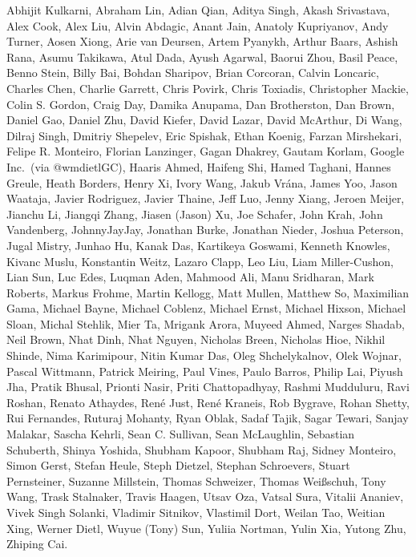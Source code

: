 Abhijit Kulkarni,
Abraham Lin,
Adian Qian,
Aditya Singh,
Akash Srivastava,
Alex Cook,
Alex Liu,
Alvin Abdagic,
Anant Jain,
Anatoly Kupriyanov,
Andy Turner,
Aosen Xiong,
Arie van Deursen,
Artem Pyanykh,
Arthur Baars,
Ashish Rana,
Asumu Takikawa,
Atul Dada,
Ayush Agarwal,
Baorui Zhou,
Basil Peace,
Benno Stein,
Billy Bai,
Bohdan Sharipov,
Brian Corcoran,
Calvin Loncaric,
Charles Chen,
Charlie Garrett,
Chris Povirk,
Chris Toxiadis,
Christopher Mackie,
Colin S. Gordon,
Craig Day,
Damika Anupama,
Dan Brotherston,
Dan Brown,
Daniel Gao,
Daniel Zhu,
David Kiefer,
David Lazar,
David McArthur,
Di Wang,
Dilraj Singh,
Dmitriy Shepelev,
Eric Spishak,
Ethan Koenig,
Farzan Mirshekari,
Felipe R. Monteiro,
Florian Lanzinger,
Gagan Dhakrey,
Gautam Korlam,
Google Inc.\ (via @wmdietlGC),
Haaris Ahmed,
Haifeng Shi,
Hamed Taghani,
Hannes Greule,
Heath Borders,
Henry Xi,
Ivory Wang,
Jakub Vr\'ana,
James Yoo,
Jason Waataja,
Javier Rodriguez,
Javier Thaine,
Jeff Luo,
Jenny Xiang,
Jeroen Meijer,
Jianchu Li,
Jiangqi Zhang,
Jiasen (Jason) Xu,
Joe Schafer,
John Krah,
John Vandenberg,
JohnnyJayJay,
Jonathan Burke,
Jonathan Nieder,
Joshua Peterson,
Jugal Mistry,
Junhao Hu,
Kanak Das,
Kartikeya Goswami,
Kenneth Knowles,
Kivanc Muslu,
Konstantin Weitz,
Lazaro Clapp,
Leo Liu,
Liam Miller-Cushon,
Lian Sun,
Luc Edes,
Luqman Aden,
Mahmood Ali,
Manu Sridharan,
Mark Roberts,
Markus Frohme,
Martin Kellogg,
Matt Mullen,
Matthew So,
Maximilian Gama,
Michael Bayne,
Michael Coblenz,
Michael Ernst,
Michael Hixson,
Michael Sloan,
Michal Stehlik,
Mier Ta,
Mrigank Arora,
Muyeed Ahmed,
Narges Shadab,
Neil Brown,
Nhat Dinh,
Nhat Nguyen,
Nicholas Breen,
Nicholas Hioe,
Nikhil Shinde,
Nima Karimipour,
Nitin Kumar Das,
Oleg Shchelykalnov,
Olek Wojnar,
Pascal Wittmann,
Patrick Meiring,
Paul Vines,
Paulo Barros,
Philip Lai,
Piyush Jha,
Pratik Bhusal,
Prionti Nasir,
Priti Chattopadhyay,
Rashmi Mudduluru,
Ravi Roshan,
Renato Athaydes,
Ren\'e Just,
Ren\'e Kraneis,
Rob Bygrave,
Rohan Shetty,
Rui Fernandes,
Ruturaj Mohanty,
Ryan Oblak,
Sadaf Tajik,
Sagar Tewari,
Sanjay Malakar,
Sascha Kehrli,
Sean C. Sullivan,
Sean McLaughlin,
Sebastian Schuberth,
Shinya Yoshida,
Shubham Kapoor,
Shubham Raj,
Sidney Monteiro,
Simon Gerst,
Stefan Heule,
Steph Dietzel,
Stephan Schroevers,
Stuart Pernsteiner,
Suzanne Millstein,
Thomas Schweizer,
Thomas Wei\ss schuh,
Tony Wang,
Trask Stalnaker,
Travis Haagen,
Utsav Oza,
Vatsal Sura,
Vitalii Ananiev,
Vivek Singh Solanki,
Vladimir Sitnikov,
Vlastimil Dort,
Weilan Tao,
Weitian Xing,
Werner Dietl,
Wuyue (Tony) Sun,
Yuliia Nortman,
Yulin Xia,
Yutong Zhu,
Zhiping Cai.
